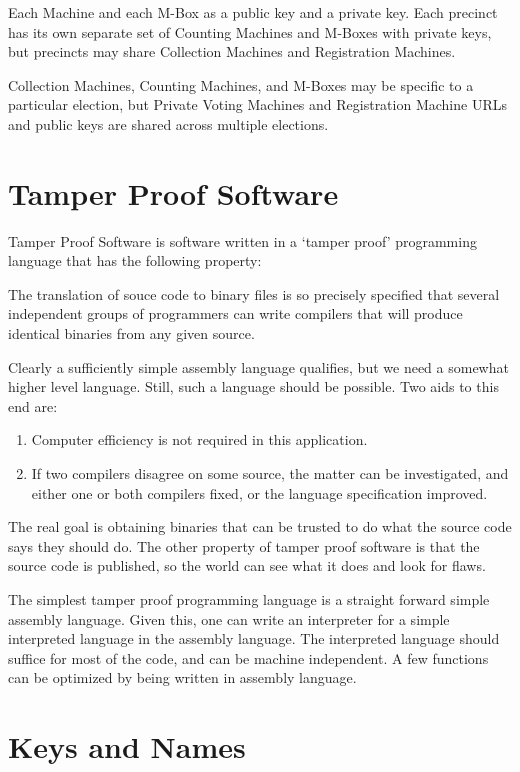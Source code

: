 \documentclass[12pt]{article}
\newenvironment{indpar}[1][0.3in]%
	{\begin{list}{}%
		     {\setlength{\itemsep}{0in}%
		      \setlength{\topsep}{0in}%
		      \setlength{\parsep}{1ex}%
		      \setlength{\labelwidth}{#1}%
		      \setlength{\leftmargin}{#1}%
		      \addtolength{\leftmargin}{\labelsep}}%
	 \item}%
	{\end{list}}
\begin{document}
Each Machine and each M-Box as a public key and a private key.
Each precinct has its own separate set of Counting Machines and M-Boxes with
private keys, but precincts may share Collection Machines and Registration
Machines.

Collection Machines, Counting Machines, and M-Boxes may be
specific to a particular election, but Private Voting Machines and
Registration Machine URLs and public keys are shared across
multiple elections.

\section{Tamper Proof Software}

Tamper Proof Software is software written in a `tamper proof'
programming language
that has the following property:
\begin{indpar}
The translation of souce code to binary files is so precisely
specified that several independent groups of programmers can
write compilers that will produce identical binaries from any
given source.
\end{indpar}

Clearly a sufficiently simple assembly language qualifies, but
we need a somewhat higher level language.  Still, such a language
should be possible.  Two aids to this end are:
\begin{enumerate}
\item
Computer efficiency is not required in this application.

\item
If two compilers disagree on some source, the matter can be
investigated, and either one or both compilers fixed, or the
language specification improved.
\end{enumerate}

The real goal is obtaining binaries that can be trusted to
do what the source code says they should do.  The other
property of tamper proof software is that the source code
is published, so the world can see what it does and look
for flaws.

The simplest tamper proof programming language is a straight
forward simple assembly language.  Given this, one can write
an interpreter for a simple interpreted language in the
assembly language.  The interpreted language should suffice
for most of the code, and can be machine independent.
A few functions can be optimized by being written in assembly
language.

\section{Keys and Names}
\end{document}
